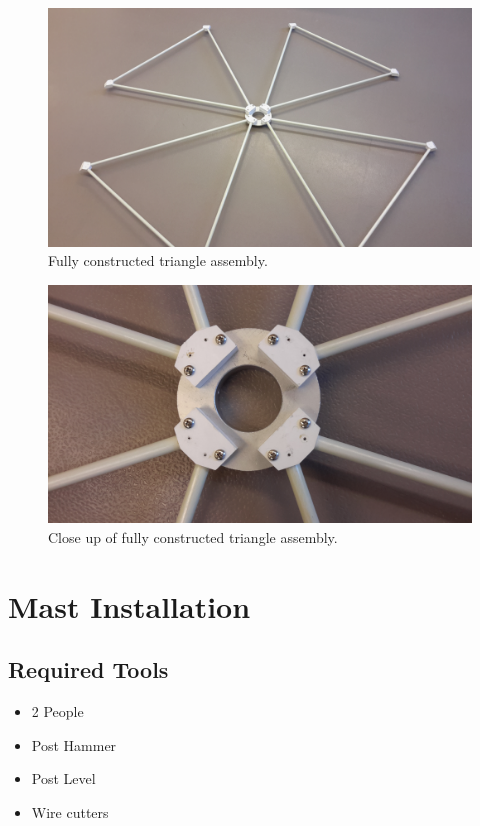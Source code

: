 \documentclass[12pt]{article}
\begin{document}
\begin{enumerate}
\begin{figure}[!hp]
   \center
     \includegraphics[width=\linewidth]{plots/20141125_100039.jpg}
        \caption{Fully constructed triangle assembly. \label{TriComplete}}
\end{figure}

\begin{figure}[!tp]
  \center
    \includegraphics[width=\linewidth]{plots/20141125_100047.jpg}
      \caption{Close up of fully constructed triangle assembly. \label{TriZoom}}
\end{figure}

\newpage

\section{Mast Installation} \label{MastInstSec}
	\subsection{Required Tools}
		\begin{itemize}
			\item 2 People
			\item Post Hammer
			\item Post Level
			\item Wire cutters
		\end{itemize}

\end{enumerate}
\end{document}
